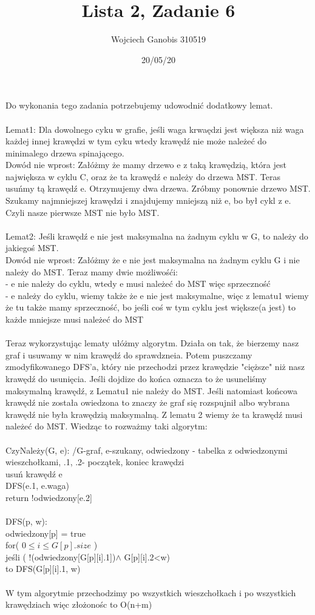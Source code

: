 \documentclass{article}
\title{Lista 2, Zadanie 6}
\author{Wojciech Ganobis 310519}
\date{20/05/20}
\newcommand\tab[1][1cm]{\hspace*{#1}}
\begin{document}
\maketitle

Do wykonania tego zadania potrzebujemy udowodnić dodatkowy lemat. \\\\
Lemat1: Dla dowolnego cyku w grafie, jeśli waga krwaędzi jest większa niż waga każdej innej krawędzi w tym cyku wtedy krawędź nie może należeć do minimalego drzewa spinającego.
\\
Dowód nie wprost: Załóżmy że mamy drzewo e z taką krawędzią, która jest największa w cyklu C, oraz że ta krawędź e należy do drzewa MST. Teras usuńmy tą krawędź e. Otrzymujemy dwa drzewa. Zróbmy ponownie drzewo MST. Szukamy najmniejszej krawędzi i znajdujemy mniejszą niż e, bo był cykl z e. Czyli nasze pierwsze MST nie było MST.
\\\\
Lemat2: Jeśli krawędź e nie jest maksymalna na żadnym cyklu w G, to należy do jakiegoś MST.
\\
Dowód nie wprost: Załóżmy że e nie jest maksymalna na żadnym cyklu G i nie należy do MST. Teraz mamy dwie możliwośći:
\\
- e nie należy do cyklu, wtedy e musi należeć do MST więc sprzeczność
\\
- e należy do cyklu, wiemy także że e nie jest maksymalne, więc z lematu1 wiemy że tu także mamy sprzeczność, bo jeśli coś w tym cyklu jest większe(a jest) to każde mniejsze musi należeć do MST
\\
\\
Teraz wykorzystując lematy ułóżmy algorytm. Działa on tak, że bierzemy nasz graf i usuwamy w nim krawędź do sprawdzneia. Potem puszczamy zmodyfikowanego DFS'a, który nie przechodzi przez krawędzie "cięższe" niż nasz krawędź do usunięcia. Jeśli dojdize do końca oznacza to że usuneliśmy maksymalną krawędź, z Lematu1 nie należy do MST. Jeśli natomiast końcowa krawędź nie została owiedzona to znaczy że graf się rozspujnił albo wybrana krawędź nie była krawędzią maksymalną. Z lematu 2 wiemy że ta krawędź musi należeć do MST.
Wiedząc to rozważmy taki algorytm:\\\\
CzyNależy(G, e):        /G-graf, e-szukany, odwiedzony - tabelka z odwiedzonymi wieszchołkami, .1, .2- początek, koniec krawędzi\\
\tab usuń krawędź e\\
\tab DFS(e.1, e.waga)\\
\tab return !odwiedzony[e.2]\\
\\
DFS(p, w):\\
\tab odwiedzony[p] = true\\
\tab for( $0 \leq i \leq G[p].size$ )\\
\tab\tab jeśli ( !(odwiedzony[G[p][i].1])$ \wedge$ G[p][i].2<w)\\
\tab\tab\tab to DFS(G[p][i].1, w)\\
\\
W tym algorytmie przechodzimy po wszystkich wieszchołkach i po wszystkich krawędziach więc złożonośc to O(n+m)\\
\end{document}
